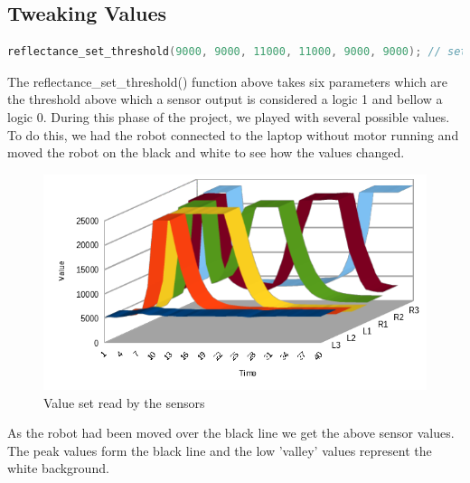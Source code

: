 \documentclass[11pt,a4paper,oneside,article]{memoir}
\begin{document}
\subsection{Tweaking Values}
\vspace{-22pt}\begin{lstlisting}[language=C,caption={Reflectance Threshold},label=Refthreshold] 
reflectance_set_threshold(9000, 9000, 11000, 11000, 9000, 9000); // set center sensor threshold to 11000 and others to 9000
\end{lstlisting}\vspace{-22pt}
The reflectance\_set\_threshold() function above takes six parameters which are the threshold above which a sensor output is considered a logic 1 and bellow a logic 0. During this phase of the project, we played with several possible values. To do this, we had the robot connected to the laptop without motor running and moved the robot on the black and white to see how the values changed.\\
\begin{figure}[h]
	\centering
	\includegraphics[width=12cm]{illustration/reading_chart}
	\caption[Value set read by the sensors]{Value set read by the sensors}
	\label{fig:readingchart}
\end{figure}
As the robot had been moved over the black line we get the above sensor values. The peak values form the black line and the low 'valley' values represent the white background.
\end{document}
